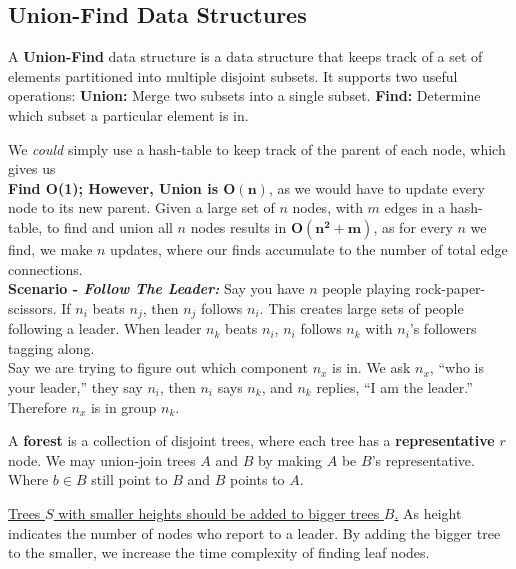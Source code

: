 \subsection{Union-Find Data Structures}
\begin{Def}

    A \textbf{Union-Find} data structure is a data structure that keeps track of a set of elements partitioned into multiple disjoint subsets. 
    It supports two useful operations: \textbf{Union:} Merge two subsets into a single subset. \textbf{Find:} Determine which subset a particular element is in.
\end{Def}

\noindent
We \textit{could} simply use a hash-table to keep track of the parent of each node, which gives us\\ 
\textbf{Find O(1); However, Union is $\mathbf{O(n)}$}, as we would have to update every node to its new parent. Given a large set of $n$ nodes, with $m$ edges in a hash-table, to find and union all $n$ nodes
results in \textbf{$\mathbf{O(n^2+m)}$}, as for every $n$ we find, we make $n$ updates, where our finds accumulate to the number of total edge connections.\\

\noindent
\textbf{Scenario - \textit{Follow The Leader:}}
Say you have $n$ people playing rock-paper-scissors. If $n_i$ beats $n_j$, then $n_j$ follows $n_i$. This 
creates large sets of people following a leader. When leader $n_k$ beats $n_i$, $n_i$ follows $n_k$ with $n_i$'s followers tagging along.\\

\noindent
Say we are trying to figure out which component $n_x$ is in. We ask $n_x$, ``who is your leader,'' they say $n_i$, then $n_i$ says $n_k$, and $n_k$ replies, ``I am the leader.'' 
Therefore $n_x$ is in group $n_k$.
\begin{Def}[Forest]

    A \textbf{forest} is a collection of disjoint trees, where each tree has a \textbf{representative} $r$ node. We may
    union-join trees $A$ and $B$ by making $A$ be $B$'s representative. Where $b\in B$ still point to $B$ and $B$ points to $A$.

    \underline{Trees $S$ with smaller heights should be added to bigger trees $B$.} As height indicates the number of nodes who report to a leader.
    By adding the bigger tree to the smaller, we increase the time complexity of finding leaf nodes.

\end{Def}

